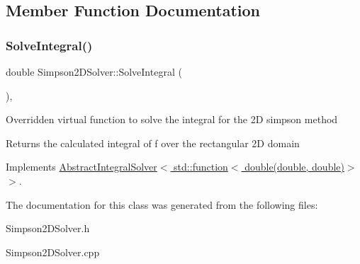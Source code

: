 \subsection{Member Function Documentation}
\mbox{\label{class_simpson2_d_solver_a3fc19037fef83ad05381138d9f7da939}} 
\subsubsection{\texorpdfstring{Solve\+Integral()}{SolveIntegral()}}
{\footnotesize\ttfamily double Simpson2\+D\+Solver\+::\+Solve\+Integral (\begin{DoxyParamCaption}{ }\end{DoxyParamCaption})\hspace{0.3cm}{\ttfamily [override]}, {\ttfamily [virtual]}}

Overridden virtual function to solve the integral for the 2D simpson method \begin{DoxyReturn}{Returns}
the calculated integral of f over the rectangular 2D domain 
\end{DoxyReturn}


Implements \hyperlink{class_abstract_integral_solver}{Abstract\+Integral\+Solver$<$ std\+::function$<$ double(double, double)$>$ $>$}.



The documentation for this class was generated from the following files\+:\begin{DoxyCompactItemize}
\item 
Simpson2\+D\+Solver.\+h\item 
Simpson2\+D\+Solver.\+cpp\end{DoxyCompactItemize}
